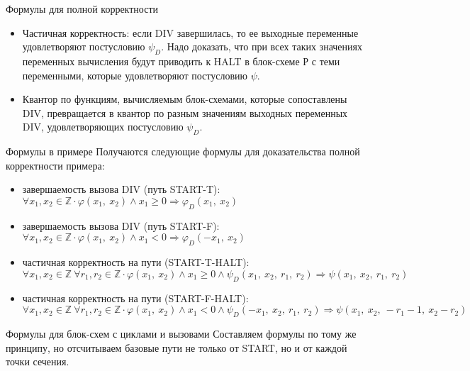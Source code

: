 \documentclass[hyperref={unicode=true}]{beamer}
\begin{document}
    \begin{frame}{Формулы для полной корректности}
    \begin{itemize}
    \item Частичная корректность: если DIV завершилась, то ее выходные
            переменные удовлетворяют постусловию $\psi_D$. Надо доказать,
            что при всех таких значениях переменных вычисления будут
            приводить к HALT в блок-схеме Р с теми переменными, которые
            удовлетворяют постусловию $\psi$.
    \item Квантор по функциям, вычисляемым блок-схемами, которые
            сопоставлены DIV, превращается в квантор по разным значениям
            выходных переменных DIV, удовлетворяющих постусловию $\psi_D$.
    \end{itemize}
    \end{frame}

    \begin{frame}{Формулы в примере}
    Получаются следующие формулы для доказательства полной корректности
    примера:

    \begin{itemize}
    \item завершаемость вызова DIV (путь START-T):
        $\forall x_1, x_2 \in \mathbb{Z} \cdot
                \varphi(x_1,~x_2) \land x_1 \geq 0
                \Rightarrow \varphi_D(x_1,~x_2)$
    \item завершаемость вызова DIV (путь START-F):
        $\forall x_1, x_2 \in \mathbb{Z} \cdot
                \varphi(x_1,~x_2) \land x_1 < 0
                \Rightarrow \varphi_D(-x_1,~x_2)$
    \item частичная корректность на пути (START-T-HALT):
        $\forall x_1, x_2 \in \mathbb{Z} ~ \forall r_1, r_2 \in \mathbb{Z} \cdot
                \varphi(x_1,~x_2) \land x_1 \geq 0 \land
                \psi_D(x_1,~x_2,~r_1,~r_2)
                \Rightarrow \psi(x_1,~x_2,~r_1,~r_2)$
    \item частичная корректность на пути (START-F-HALT):
        $\forall x_1, x_2 \in \mathbb{Z} ~ \forall r_1, r_2 \in \mathbb{Z} \cdot
                \varphi(x_1,~x_2) \land x_1 < 0 \land
                \psi_D(-x_1,~x_2,~r_1,~r_2)
                \Rightarrow \psi(x_1,~x_2,~-r_1-1,~x_2 - r_2)$
    \end{itemize}
    \end{frame}

    \begin{frame}{Формулы для блок-схем с циклами и вызовами}
    Составляем формулы по тому же принципу, но отсчитываем
    базовые пути не только от START, но и от каждой точки сечения.
    \end{frame}
\end{document}
